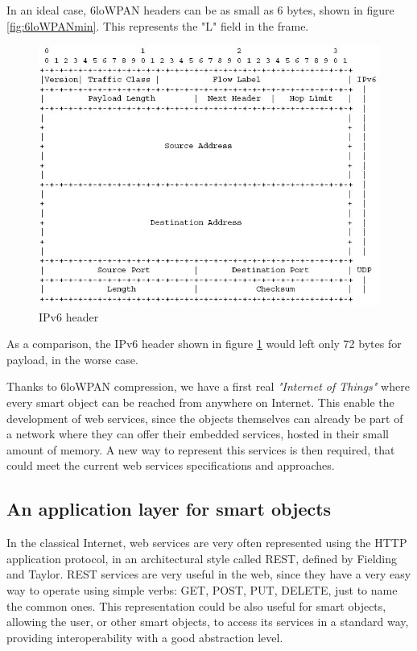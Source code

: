 In an ideal case, 6loWPAN headers can be as small as 6 bytes, shown in figure \ref{fig:6loWPANmin}.
This represents the "L" field in the frame.
\begin{figure}[htb]
	\centering
	\includegraphics[width=1\columnwidth]{chapters/background.images/ipv6Details.jpg}
	\caption{IPv6 header}
	\label{fig:IPv6Header}
\end{figure}
As a comparison, the IPv6 header shown in figure \ref{fig:IPv6Header} would left only 72 bytes for payload, in the worse case.

Thanks to 6loWPAN compression, we have a first real \textit{"Internet of Things"} where every smart object can be reached from anywhere on Internet.
This enable the development of web services, since the objects themselves can already be part of a network where they can offer their embedded services, hosted in their small amount of memory.
A new way to represent this services is then required, that could meet the current web services specifications and approaches.

\subsection{An application layer for smart objects}
In the classical Internet, web services are very often represented using the HTTP application protocol\cite{rfc2616}, in an architectural style called REST, defined by Fielding and Taylor\cite{Fielding02REST}.
REST services are very useful in the web, since they have a very easy way to operate using simple verbs: GET, POST, PUT, DELETE, just to name the common ones.
This representation could be also useful for smart objects, allowing the user, or other smart objects, to access its services in a standard way, providing interoperability with a good abstraction level.

